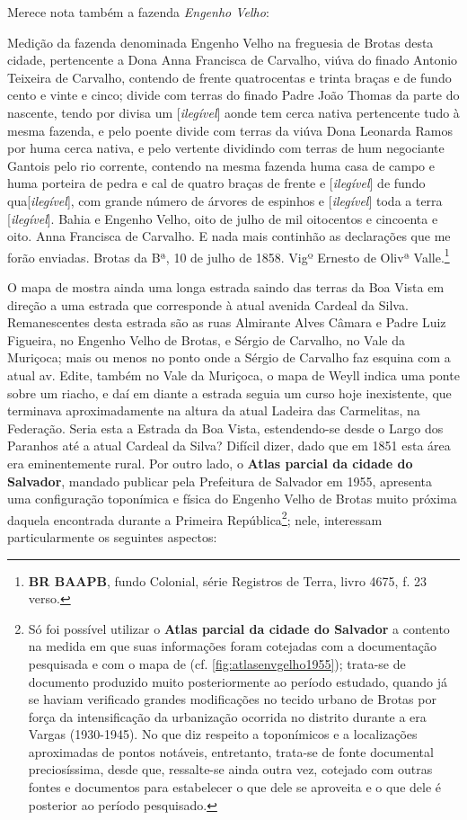 Merece nota também a fazenda \textit{Engenho Velho}:

\begin{citacao}
Medição da fazenda denominada Engenho Velho na freguesia de Brotas desta cidade, pertencente a Dona Anna Francisca de Carvalho, viúva do finado Antonio Teixeira de Carvalho, contendo de frente quatrocentas e trinta braças e de fundo cento e vinte e cinco; divide com terras do finado Padre João Thomas da parte do nascente, tendo por divisa um [\textit{ilegível}] aonde tem cerca nativa pertencente tudo à mesma fazenda, e pelo poente divide com terras da viúva Dona Leonarda Ramos por huma cerca nativa, e pelo vertente dividindo com terras de hum negociante Gantois pelo rio corrente, contendo na mesma fazenda huma casa de campo e huma porteira de pedra e cal de quatro braças de frente e [\textit{ilegível}] de fundo qua[\textit{ilegível}], com grande número de árvores de espinhos e [\textit{ilegível}] toda a terra [\textit{ilegível}]. Bahia e Engenho Velho, oito de julho de mil oitocentos e cincoenta e oito. Anna Francisca de Carvalho. E nada mais continhão as declarações que me forão enviadas. Brotas da Bª, 10 de julho de 1858.
Vigº Ernesto de Olivª Valle.\footnote{\textbf{BR BAAPB}, fundo Colonial, série Registros de Terra, livro 4675, f. 23 verso.}
\end{citacao}

O mapa de  mostra ainda uma longa estrada saindo das terras da Boa Vista em direção a uma estrada que corresponde à atual avenida Cardeal da Silva. Remanescentes desta estrada são as ruas Almirante Alves Câmara e Padre Luiz Figueira, no Engenho Velho de Brotas, e Sérgio de Carvalho, no Vale da Muriçoca; mais ou menos no ponto onde a Sérgio de Carvalho faz esquina com a atual av. Edite, também no Vale da Muriçoca, o mapa de Weyll indica uma ponte sobre um riacho, e daí em diante a estrada seguia um curso hoje inexistente, que terminava aproximadamente na altura da atual Ladeira das Carmelitas, na Federação. Seria esta a Estrada da Boa Vista, estendendo-se desde o Largo dos Paranhos até a atual Cardeal da Silva? Difícil dizer, dado que em 1851 esta área era eminentemente rural. Por outro lado, o \textbf{Atlas parcial da cidade do Salvador}, mandado publicar pela Prefeitura de Salvador em 1955, apresenta uma configuração toponímica e física do Engenho Velho de Brotas muito próxima daquela encontrada durante a Primeira República\footnote{Só foi possível utilizar o \textbf{Atlas parcial da cidade do Salvador} a contento na medida em que suas informações foram cotejadas com a documentação pesquisada e com o mapa de  (cf. \autoref{fig:atlasenvgelho1955}); trata-se de documento produzido muito posteriormente ao período estudado, quando já se haviam verificado grandes modificações no tecido urbano de Brotas por força da intensificação da urbanização ocorrida no distrito durante a era Vargas (1930-1945). No que diz respeito a toponímicos e a localizações aproximadas de pontos notáveis, entretanto, trata-se de fonte documental preciosíssima, desde que, ressalte-se ainda outra vez, cotejado com outras fontes e documentos para estabelecer o que dele se aproveita e o que dele é posterior ao período pesquisado.}; nele, interessam particularmente os seguintes aspectos:

